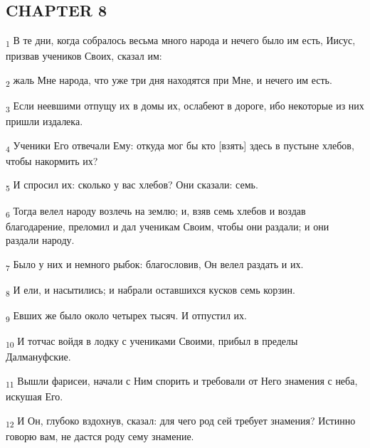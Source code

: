 \subsection{CHAPTER 8}
\begin{tcolorbox}
\textsubscript{1} В те дни, когда собралось весьма много народа и нечего было им есть, Иисус, призвав учеников Своих, сказал им:
\end{tcolorbox}
\begin{tcolorbox}
\textsubscript{2} жаль Мне народа, что уже три дня находятся при Мне, и нечего им есть.
\end{tcolorbox}
\begin{tcolorbox}
\textsubscript{3} Если неевшими отпущу их в домы их, ослабеют в дороге, ибо некоторые из них пришли издалека.
\end{tcolorbox}
\begin{tcolorbox}
\textsubscript{4} Ученики Его отвечали Ему: откуда мог бы кто [взять] здесь в пустыне хлебов, чтобы накормить их?
\end{tcolorbox}
\begin{tcolorbox}
\textsubscript{5} И спросил их: сколько у вас хлебов? Они сказали: семь.
\end{tcolorbox}
\begin{tcolorbox}
\textsubscript{6} Тогда велел народу возлечь на землю; и, взяв семь хлебов и воздав благодарение, преломил и дал ученикам Своим, чтобы они раздали; и они раздали народу.
\end{tcolorbox}
\begin{tcolorbox}
\textsubscript{7} Было у них и немного рыбок: благословив, Он велел раздать и их.
\end{tcolorbox}
\begin{tcolorbox}
\textsubscript{8} И ели, и насытились; и набрали оставшихся кусков семь корзин.
\end{tcolorbox}
\begin{tcolorbox}
\textsubscript{9} Евших же было около четырех тысяч. И отпустил их.
\end{tcolorbox}
\begin{tcolorbox}
\textsubscript{10} И тотчас войдя в лодку с учениками Своими, прибыл в пределы Далмануфские.
\end{tcolorbox}
\begin{tcolorbox}
\textsubscript{11} Вышли фарисеи, начали с Ним спорить и требовали от Него знамения с неба, искушая Его.
\end{tcolorbox}
\begin{tcolorbox}
\textsubscript{12} И Он, глубоко вздохнув, сказал: для чего род сей требует знамения? Истинно говорю вам, не дастся роду сему знамение.
\end{tcolorbox}
